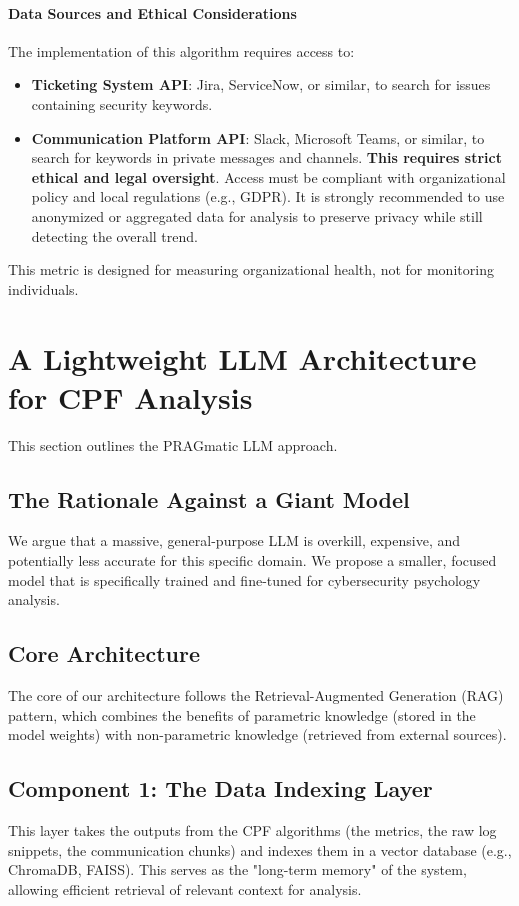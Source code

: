 \documentclass[11pt, a4paper]{article}
\begin{document}
\paragraph{Data Sources and Ethical Considerations} The implementation of this algorithm requires access to:
\begin{itemize}
    \item \textbf{Ticketing System API}: Jira, ServiceNow, or similar, to search for issues containing security keywords.
    \item \textbf{Communication Platform API}: Slack, Microsoft Teams, or similar, to search for keywords in private messages and channels. \textbf{This requires strict ethical and legal oversight}. Access must be compliant with organizational policy and local regulations (e.g., GDPR). It is strongly recommended to use anonymized or aggregated data for analysis to preserve privacy while still detecting the overall trend.
\end{itemize}
This metric is designed for measuring organizational health, not for monitoring individuals.

\section{A Lightweight LLM Architecture for CPF Analysis}
\label{sec:llm_architecture}

This section outlines the PRAGmatic LLM approach.

\subsection{The Rationale Against a Giant Model}
We argue that a massive, general-purpose LLM is overkill, expensive, and potentially less accurate for this specific domain. We propose a smaller, focused model that is specifically trained and fine-tuned for cybersecurity psychology analysis.

\subsection{Core Architecture}
The core of our architecture follows the Retrieval-Augmented Generation (RAG) pattern, which combines the benefits of parametric knowledge (stored in the model weights) with non-parametric knowledge (retrieved from external sources).

\subsection{Component 1: The Data Indexing Layer}
This layer takes the outputs from the CPF algorithms (the metrics, the raw log snippets, the communication chunks) and indexes them in a vector database (e.g., ChromaDB, FAISS). This serves as the "long-term memory" of the system, allowing efficient retrieval of relevant context for analysis.
\end{document}
